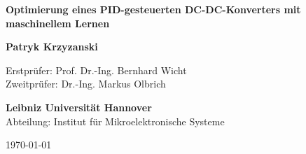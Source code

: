 \begin{titlepage}
    \centering
    \vspace*{1cm}
    
    \textbf{\LARGE Optimierung eines PID-gesteuerten DC-DC-Konverters mit maschinellem Lernen}
    
    \vspace{1.5cm}
    
    \textbf{Patryk Krzyzanski}
    
    \vspace{1.5cm}
    
    Erstprüfer: Prof. Dr.-Ing. Bernhard Wicht\\
    Zweitprüfer: Dr.-Ing. Markus Olbrich
    
    \vspace{1.5cm}
    
    \textbf{Leibniz Universität Hannover}\\
    Abteilung: Institut für Mikroelektronische Systeme
    
    \vspace{1cm}
    
    \today
    
\end{titlepage}
